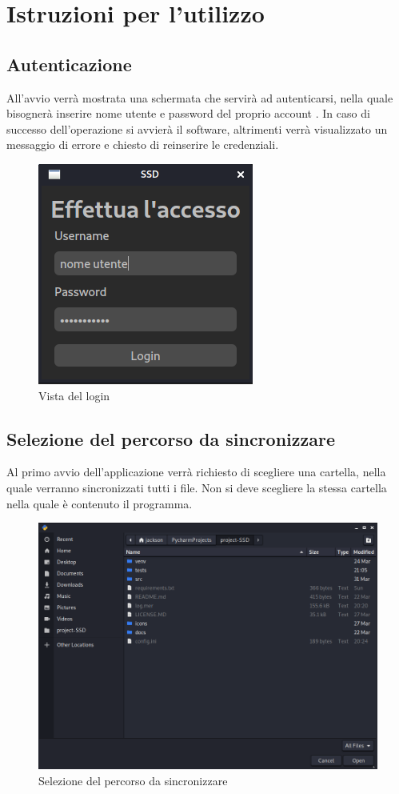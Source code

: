 \section{Istruzioni per l'utilizzo}
\subsection{Autenticazione}
All'avvio verrà mostrata una schermata che servirà ad autenticarsi, nella quale bisognerà inserire nome utente e password del proprio account . In caso di successo dell'operazione si avvierà il software, altrimenti verrà visualizzato un messaggio di errore e chiesto di reinserire le credenziali.
\begin{figure}[H]
    \centering
    \includegraphics[scale = 0.50]{components/img/login.png}
    \caption{Vista del login}
    \label{fig:Vista del login}
\end{figure}
\subsection{Selezione del percorso da sincronizzare}
\label{sec:selezionepath}
Al primo avvio dell'applicazione verrà richiesto di scegliere una cartella, nella quale verranno sincronizzati tutti i file. Non si deve scegliere la stessa cartella nella quale è contenuto il programma.
\begin{figure}[H]
    \centering
    \includegraphics[scale = 0.30]{components/img/selezione-path.png}
    \caption{Selezione del percorso da sincronizzare}
    \label{fig:Selezione del percorso da sincronizzare}
\end{figure}

